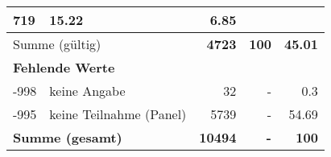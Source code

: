 \begin{longtable}{lXrrr}
       \num{719} &
       \num[round-mode=places,round-precision=2]{15.22} &
         \num[round-mode=places,round-precision=2]{6.85} \\
     \midrule
     \multicolumn{2}{l}{Summe (gültig)} &
       \textbf{\num{4723}} &
     \textbf{\num{100}} &
       \textbf{\num[round-mode=places,round-precision=2]{45.01}} \\
     \multicolumn{5}{l}{\textbf{Fehlende Werte}}\\
       -998 &
       keine Angabe &
         \num{32} &
        - &
         \num[round-mode=places,round-precision=2]{0.3} \\
       -995 &
       keine Teilnahme (Panel) &
         \num{5739} &
        - &
         \num[round-mode=places,round-precision=2]{54.69} \\
     \midrule
     \multicolumn{2}{l}{\textbf{Summe (gesamt)}} &
          \textbf{\num{10494}} &
        \textbf{-} &
        \textbf{\num{100}} \\
     \bottomrule
     \end{longtable}
     
